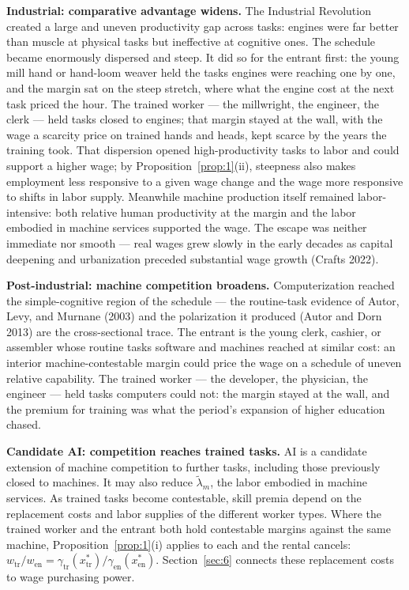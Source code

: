 \documentclass[12pt]{article}
\theoremstyle{plain}
\begin{document}
\textbf{Industrial: comparative advantage widens.} The Industrial Revolution created a large and uneven productivity gap across tasks: engines were far better than muscle at physical tasks but ineffective at cognitive ones. The schedule became enormously dispersed and steep. It did so for the entrant first: the young mill hand or hand-loom weaver held the tasks engines were reaching one by one, and the margin sat on the steep stretch, where what the engine cost at the next task priced the hour. The trained worker --- the millwright, the engineer, the clerk --- held tasks closed to engines; that margin stayed at the wall, with the wage a scarcity price on trained hands and heads, kept scarce by the years the training took. That dispersion opened high-productivity tasks to labor and could support a higher wage; by Proposition~\ref{prop:1}(ii), steepness also makes employment less responsive to a given wage change and the wage more responsive to shifts in labor supply. Meanwhile machine production itself remained labor-intensive: both relative human productivity at the margin and the labor embodied in machine services supported the wage. The escape was neither immediate nor smooth --- real wages grew slowly in the early decades as capital deepening and urbanization preceded substantial wage growth (Crafts 2022).

\textbf{Post-industrial: machine competition broadens.} Computerization reached the simple-cognitive region of the schedule --- the routine-task evidence of Autor, Levy, and Murnane (2003) and the polarization it produced (Autor and Dorn 2013) are the cross-sectional trace. The entrant is the young clerk, cashier, or assembler whose routine tasks software and machines reached at similar cost: an interior machine-contestable margin could price the wage on a schedule of uneven relative capability. The trained worker --- the developer, the physician, the engineer --- held tasks computers could not: the margin stayed at the wall, and the premium for training was what the period's expansion of higher education chased.

\textbf{Candidate AI: competition reaches trained tasks.} AI is a candidate extension of machine competition to further tasks, including those previously closed to machines. It may also reduce $\widetilde{\lambda}_m$, the labor embodied in machine services. As trained tasks become contestable, skill premia depend on the replacement costs and labor supplies of the different worker types. Where the trained worker and the entrant both hold contestable margins against the same machine, Proposition~\ref{prop:1}(i) applies to each and the rental cancels: $w_{\mathrm{tr}}/w_{\mathrm{en}}=\gamma_{\mathrm{tr}}(x^*_{\mathrm{tr}})/\gamma_{\mathrm{en}}(x^*_{\mathrm{en}})$. Section~\ref{sec:6} connects these replacement costs to wage purchasing power.
\end{document}
